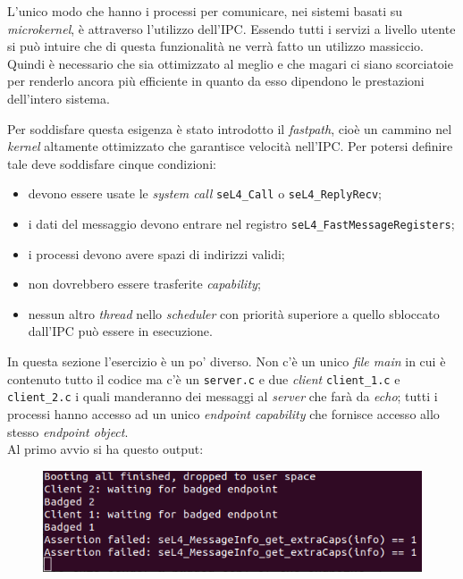 L'unico modo che hanno i processi per comunicare, nei sistemi basati su \textit{microkernel}, è attraverso l'utilizzo dell'IPC. Essendo tutti i servizi a livello utente si può intuire che di questa funzionalità ne verrà fatto un utilizzo massiccio. Quindi è necessario che sia ottimizzato al meglio e che magari ci siano scorciatoie per renderlo ancora più efficiente in quanto da esso dipendono le prestazioni dell'intero sistema.

Per soddisfare questa esigenza è stato introdotto il \textit{fastpath}, cioè un cammino nel \textit{kernel} altamente ottimizzato che garantisce velocità nell'IPC. Per potersi definire tale deve soddisfare cinque condizioni:
\begin{itemize}
	\item devono essere usate le \textit{system call} \texttt{seL4\_Call} o \texttt{seL4\_ReplyRecv};
	\item i dati del messaggio devono entrare nel registro \texttt{seL4\_FastMessageRegisters};
	\item i processi devono avere spazi di indirizzi validi;
	\item non dovrebbero essere trasferite \textit{capability};
	\item nessun altro \textit{thread} nello \textit{scheduler} con priorità superiore a quello sbloccato dall'IPC può essere in esecuzione.
\end{itemize}

In questa sezione l'esercizio è un po' diverso. Non c'è un unico \textit{file main} in cui è contenuto tutto il codice ma c'è un \texttt{server.c} e due \textit{client} \texttt{client\_1.c} e \texttt{client\_2.c} i quali manderanno dei messaggi al \textit{server} che farà da \textit{echo}; tutti i processi hanno accesso ad un unico \textit{endpoint capability} che fornisce accesso allo stesso \textit{endpoint object}.\\
Al primo avvio si ha questo output:
\begin{figure}[H]
  \includegraphics[scale=0.7]{img/PrimoAvvioIPC2.png}%
  \centering
  \label{fig:PrimoAvvio}
\end{figure}

